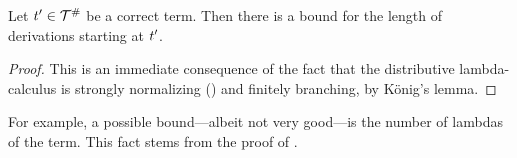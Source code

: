 \begin{corollary}
Let $t' \in \mathcal{T}^{\mathtt{\#}}$ be a correct term.
Then there is a bound for the length of derivations starting at $t'$.
\end{corollary}
\begin{proof}
This is an immediate consequence of the fact that the distributive lambda-calculus
is strongly normalizing () and finitely branching, by K\"onig's lemma.
\end{proof}

\begin{remark}
For example, a possible bound---albeit not very good---is the number of lambdas of the term.
This fact stems from the proof of .
\end{remark}


